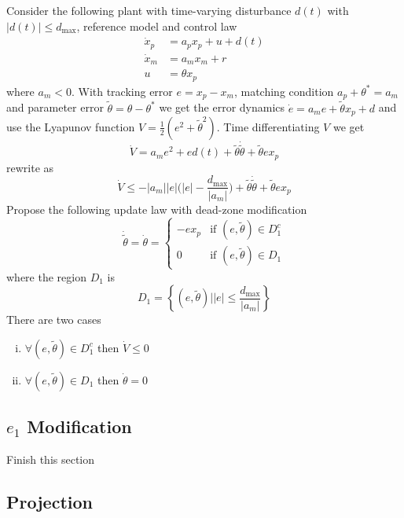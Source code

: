Consider the following plant with time-varying disturbance $d(t)$ with $|d(t)|\leq d_{\text{max}}$, reference model and control law
\begin{align*}
  \dot{x}_{p}&=a_{p}x_{p}+u+d(t) \\
  \dot{x}_{m}&=a_{m}x_{m}+r \\
  u&=\theta x_{p}
\end{align*}
where $a_{m}<0$.
With tracking error $e=x_{p}-x_{m}$, matching condition $a_{p}+\theta^{*}=a_{m}$ and parameter error $\tilde{\theta}=\theta-\theta^{*}$ we get the error dynamics $\dot{e}=a_{m}e+\tilde{\theta}x_{p}+d$ and use the Lyapunov function $V=\frac{1}{2}(e^{2}+\tilde{\theta}^{2})$.
Time differentiating $V$ we get
\begin{equation*}
  \dot{V}=a_{m}e^{2}+ed(t)+\tilde{\theta}\dot{\tilde{\theta}}+\tilde{\theta}ex_{p}
\end{equation*}
rewrite as
\begin{equation*}
  \dot{V}\leq-|a_{m}||e|\biggr(|e|-\frac{d_{\text{max}}}{|a_{m}|}\biggr)+\tilde{\theta}\dot{\tilde{\theta}}+\tilde{\theta}ex_{p}
\end{equation*}
Propose the following update law with dead-zone modification
\begin{equation*}
  \dot{\tilde{\theta}}=\dot{\theta}=
  \begin{cases}
    -ex_{p} &\mbox{if } (e,\tilde{\theta})\in D_{1}^{c} \\
    0 & \mbox{if } (e,\tilde{\theta})\in D_{1}
  \end{cases}
\end{equation*}
where the region $D_{1}$ is
\begin{equation*}
  D_{1}=\left\{(e,\tilde{\theta})\biggr||e|\leq\frac{d_{\text{max}}}{|a_{m}|}\right\}
\end{equation*}
There are two cases
\begin{enumerate}[(i)]
  \item{$\forall (e,\tilde{\theta})\in D_{1}^{c}$ then $\dot{V}\leq 0$}
  \item{$\forall (e,\tilde{\theta})\in D_{1}$ then $\dot{\theta}=0$}
\end{enumerate}

\subsection{\texorpdfstring{$e_{1}$}{e1} Modification}

Finish this section

\subsection{Projection}

